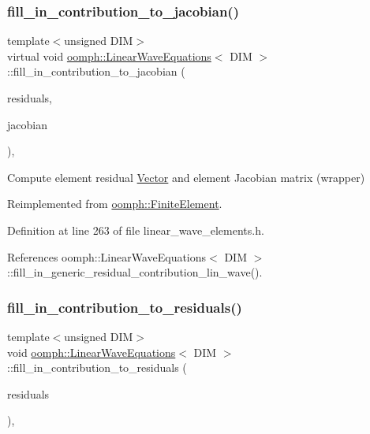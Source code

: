 \subsubsection{\texorpdfstring{fill\+\_\+in\+\_\+contribution\+\_\+to\+\_\+jacobian()}{fill\_in\_contribution\_to\_jacobian()}}
{\footnotesize\ttfamily template$<$unsigned D\+IM$>$ \\
virtual void \hyperlink{classoomph_1_1LinearWaveEquations}{oomph\+::\+Linear\+Wave\+Equations}$<$ D\+IM $>$\+::fill\+\_\+in\+\_\+contribution\+\_\+to\+\_\+jacobian (\begin{DoxyParamCaption}\item[{\hyperlink{classoomph_1_1Vector}{Vector}$<$ double $>$ \&}]{residuals,  }\item[{\hyperlink{classoomph_1_1DenseMatrix}{Dense\+Matrix}$<$ double $>$ \&}]{jacobian }\end{DoxyParamCaption})\hspace{0.3cm}{\ttfamily [inline]}, {\ttfamily [virtual]}}



Compute element residual \hyperlink{classoomph_1_1Vector}{Vector} and element Jacobian matrix (wrapper) 



Reimplemented from \hyperlink{classoomph_1_1FiniteElement_a0ae7af222af38a0d53bf283dc85bdfea}{oomph\+::\+Finite\+Element}.



Definition at line 263 of file linear\+\_\+wave\+\_\+elements.\+h.



References oomph\+::\+Linear\+Wave\+Equations$<$ D\+I\+M $>$\+::fill\+\_\+in\+\_\+generic\+\_\+residual\+\_\+contribution\+\_\+lin\+\_\+wave().

\mbox{\label{classoomph_1_1LinearWaveEquations_a51319cb9bbb054c6a79d63b203d7d163}} 
\subsubsection{\texorpdfstring{fill\+\_\+in\+\_\+contribution\+\_\+to\+\_\+residuals()}{fill\_in\_contribution\_to\_residuals()}}
{\footnotesize\ttfamily template$<$unsigned D\+IM$>$ \\
void \hyperlink{classoomph_1_1LinearWaveEquations}{oomph\+::\+Linear\+Wave\+Equations}$<$ D\+IM $>$\+::fill\+\_\+in\+\_\+contribution\+\_\+to\+\_\+residuals (\begin{DoxyParamCaption}\item[{\hyperlink{classoomph_1_1Vector}{Vector}$<$ double $>$ \&}]{residuals }\end{DoxyParamCaption})\hspace{0.3cm}{\ttfamily [inline]}, {\ttfamily [virtual]}}



